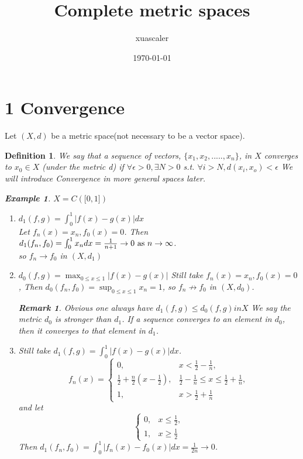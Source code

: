 \documentclass{article}
\title{Complete metric spaces}
\author{xuascaler}
\date{\today}
\newtheorem*{definition}{Definition}
\newtheorem*{remark}{Remark}
\newtheorem*{example}{Example}
\begin{document}
\maketitle
\section*{1 Convergence}
Let $(X, d)$ be a metric space(not necessary to be a vector space).
\begin{definition}
    We say that a sequence of vectors, $\{x_1, x_2, ....., x_n\}$, in $X$ converges to $x_0 \in X$
    (under the metric d)
    if $\forall \epsilon > 0, \exists N > 0$ s.t. $\forall i > N, d(x_i, x_o)<\epsilon$
    We will introduce Convergence in more general spaces later.
    \begin{example}
        $X=C(\bigl[0, 1\bigr])$
        \begin{enumerate}
            \item $d_1(f, g) = \int_{0}^{1}{|f(x) - g(x)|dx}$ \\
            Let $f_n(x) = x_n, f_0(x)=0$. 
            Then $d_1(f_n, f_0) = \int_{0}^{1}{x_n}dx = \frac{1}{n+1} \rightarrow 0 \textnormal{ as } n \rightarrow \infty$. \\
            so $f_n \rightarrow f_0$ in $(X, d_1)$
            \item $d_0(f, g) = \max_{0 \le x \le 1}|f(x) - g(x)|$
            Still take $f_n(x) = x_n, f_0(x) = 0$, Then
            $d_0(f_n, f_0) = \sup_{0 \le x \le 1}{x_n} = 1$,
            so $f_n \not\rightarrow f_0$ in $(X, d_0)$.
            \begin{remark}
                Obvious one always have $d_1(f, g) \le d_0(f, g) in X$
                We say the metric $d_0$ is stronger than $d_1$. If a sequence converges to an 
                element in $d_0$, then it converges to that element in $d_1$.
            \end{remark}
            \item Still take $d_1(f,g) = \int_{0}^{1}{|f(x)-g(x)|dx}$. 
            \[
                f_n(x) = 
                \begin{cases}
                    0, & x < \frac{1}{2} - \frac{1}{n}, \\
                    \frac{1}{2} + \frac{n}{2}(x - \frac{1}{2}), & \frac{1}{2} - \frac{1}{n} \le x \le \frac{1}{2} + \frac{1}{n}, \\
                    1, & x > \frac{1}{2} + \frac{1}{n}
                \end{cases}
            \]
            and let \[
                \begin{cases}
                    0, & x \le \frac{1}{2}, \\
                    1, & x \ge \frac{1}{2}
                \end{cases}
            \] 
            Then $d_1(f_n, f_0) = \int_{0}^{1}{|f_n(x) - f_0(x)|dx} = \frac{1}{2n} \rightarrow 0$.
        \end{enumerate}
    \end{example}
\end{definition}
\end{document}
